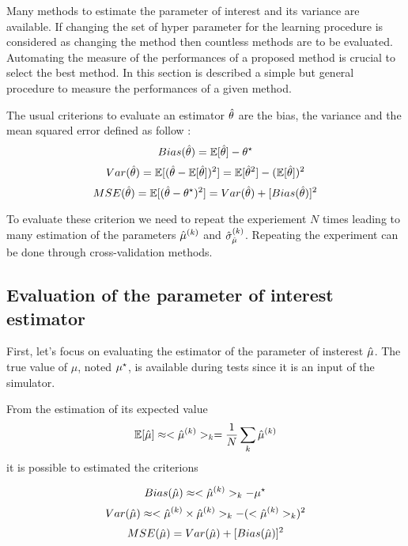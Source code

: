 Many methods to estimate the parameter of interest and its variance are available.
If changing the set of hyper parameter for the learning procedure is considered as changing the method then countless methods are to be evaluated.
Automating the measure of the performances of a proposed method is crucial to select the best method.
In this section is described a simple but general procedure to measure the performances of a given method.

The usual criterions to evaluate an estimator $\hat\theta$ are the bias, the variance and the mean squared error defined as follow :
\begin{equation}
	Bias(\hat\theta) = \mathbb{E}[\hat\theta] - \theta^\star
\end{equation}
\begin{equation}
	Var(\hat\theta) = \mathbb{E}[ (\hat\theta - \mathbb{E}[\hat\theta])^2 ] = \mathbb{E}[\hat\theta^2] - (\mathbb{E}[\hat\theta])^2
\end{equation}
\begin{equation}
	MSE(\hat\theta) = \mathbb{E}[(\hat\theta - \theta^\star)^2] = Var(\hat\theta) + [Bias(\hat\theta)]^2
\end{equation}

To evaluate these criterion we need to repeat the experiement $N$ times leading to many estimation of the parameters $\hat\mu^{(k)}$ and $\hat\sigma_{\hat\mu}^{(k)}$.
Repeating the experiment can be done through cross-validation methods.


\subsection{Evaluation of the parameter of interest estimator} %
\label{sub:evaluation_of_the_parameter_of_interest_estimator}

First, let's focus on evaluating the estimator of the parameter of insterest $\hat\mu$.
The true value of $\mu$, noted $\mu^\star$, is available during tests since it is an input of the simulator.

From the estimation of its expected value
\begin{equation}
	\mathbb{E}[\hat\mu] \approx <\hat\mu^{(k)}>_k = \frac{1}{N} \sum_{k} \hat\mu^{(k)}
\end{equation}
it is possible to estimated the criterions

\begin{equation}
	Bias(\hat\mu) \approx <\hat\mu^{(k)}>_k - \mu^\star
\end{equation}
\begin{equation}
	\label{eq:var_hmu}
	Var(\hat\mu) \approx <\hat\mu^{(k)} \times \hat\mu^{(k)}>_k - (<\hat\mu^{(k)}>_k)^2
\end{equation}
\begin{equation}
	MSE(\hat\mu) = Var(\hat\mu) + [Bias(\hat\mu)]^2
\end{equation}

